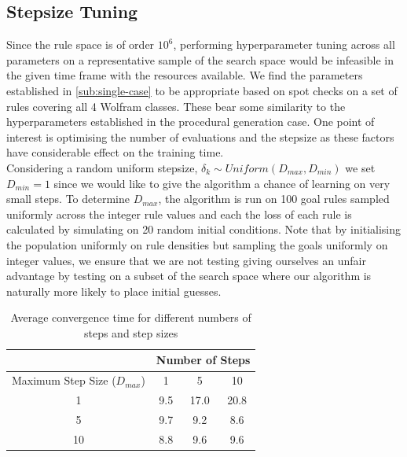 \subsection{Stepsize Tuning}\label{sub:hyperparameter-tuning}
 
Since the rule space is of order $10^6$, performing hyperparameter tuning across all parameters on a representative sample of the search space would be infeasible in the given time frame with the resources available. We find the parameters established in \ref{sub:single-case} to be appropriate based on spot checks on a set of rules covering all 4 Wolfram classes. These bear some similarity to the hyperparameters established in the procedural generation case. One point of interest is optimising the number of evaluations and the stepsize as these factors have considerable effect on the training time.\\

Considering a random uniform stepsize, $\delta_k \sim \mathit{Uniform}(D_{max}, D_{min})$ we set $D_{min} = 1$ since we would like to give the algorithm a chance of learning on very small steps. To determine $D_{max}$, the algorithm is run on 100 goal rules sampled uniformly across the integer rule values and each the loss of each rule is calculated by simulating on 20 random initial conditions. Note that by initialising the population uniformly on rule densities but sampling the goals uniformly on integer values, we ensure that we are not testing giving ourselves an unfair advantage by testing on a subset of the search space where our algorithm is naturally more likely to place initial guesses.\\

\begin{table}
    \centering
    \begin{tabular}{|c||c|c|c|}
        \hline
        & \multicolumn{3}{|c|}{Number of Steps } \\
        \hline
        Maximum Step Size ($D_{max}$) & 1 & 5 & 10 \\
        \hline
        1 & 9.5 & 17.0 & 20.8\\
        5 & 9.7 & 9.2 & 8.6 \\
        10 & 8.8 & 9.6 & 9.6\\
        \hline
    \end{tabular}
    \caption{\label{tab:stepsize-life-conv}Average convergence time for different numbers of steps and step sizes}
\end{table}

